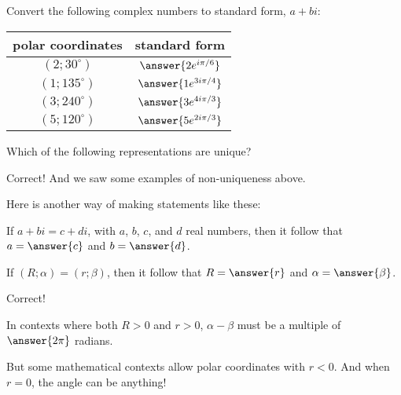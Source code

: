 \documentclass[space,nooutcomes]{ximera}
\begin{document}
\begin{problem}
Convert the following complex numbers to standard form, $a+bi$: 

\begin{center}
\begin{tabular}{c | c}
polar coordinates & standard form \\
\hline
$(2; 30^\circ)$  & $\answer{2e^{i\pi/6}}$ \\
$(1; 135^\circ)$ & $\answer{1e^{3i\pi/4}}$ \\
$(3; 240^\circ)$ & $\answer{3e^{4i\pi/3}}$ \\
$(5; 120^\circ)$ & $\answer{5e^{2i\pi/3}}$ \\
 \end{tabular}
\end{center}
\end{problem}

%

\begin{problem}
Which of the following representations are unique?  
\begin{selectAll}
\end{selectAll}
\begin{problem}
Correct!  And we saw some examples of non-uniqueness above.  

Here is another way of making statements like these: 

If $a+bi=c+di$, with $a$, $b$, $c$, and $d$ real numbers, then it  follow that $a=\answer{c}$ and $b=\answer{d}$. 

If $(R;\alpha) = (r;\beta)$, then it  follow that $R=\answer{r}$ and $\alpha=\answer{\beta}$. 

\begin{problem}
Correct!  

In contexts where both $R>0$ and $r>0$, $\alpha - \beta$ must be a multiple of $\answer{2\pi}$ radians.  

But some mathematical contexts allow polar coordinates with $r<0$.  And when $r=0$, the angle can be anything!
\end{problem}

\end{problem}

\end{problem}
\end{document}
